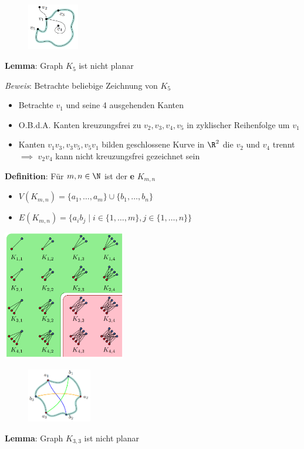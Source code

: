 \begin{figure}
	\centering
	\vspace{-40pt}
	\includegraphics[width=0.2\textwidth]{images/k5-p.png}
	\vspace{40pt}
	\vspace{-120pt}
\end{figure}
\textbf{Lemma}: Graph $K_5$ ist nicht planar

\textit{Beweis}: Betrachte beliebige Zeichnung von $K_5$
\begin{itemize}
	\item Betrachte $v_1$ und seine 4 ausgehenden Kanten
	\item O.B.d.A. Kanten kreuzungsfrei zu $v_2,v_3,v_4,v_5$ in zyklischer Reihenfolge um $v_1$
	\item Kanten $v_1v_3, v_3v_5, v_5v_1$ bilden geschlossene Kurve in $\R^2$ die $v_2$ und $v_4$ trennt $\implies$ $v_2v_4$ kann nicht kreuzungsfrei gezeichnet sein
\end{itemize}
\bigskip
\textbf{Definition}: Für $m,n\in\N$ ist der \textbf{e} $K_{m,n}$
\begin{itemize}
	\item $V(K_{m,n})=\{a_1,\ldots,a_m\}\cup\{b_1,\ldots,b_n\}$
	\item $E(K_{m,n})=\{a_ib_j \mid i \in\{1, \ldots, m\}, j \in\{1, \ldots,n\}\}$
\end{itemize}
\begin{center}
	\includegraphics[width=0.4\textwidth]{images/bg.png}
\end{center}

\begin{figure}
	\centering
	\includegraphics[width=0.25\textwidth]{images/k33-p.png}
	\vspace{-50pt}
\end{figure}
\textbf{Lemma}: Graph $K_{3,3}$ ist nicht planar

